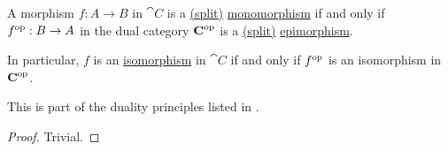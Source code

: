 \begin{proposition}\label{thm:morphism_invertibility_duality}
  A morphism \( f: A \to B \) in \( \cat{C} \) is a \hyperref[def:morphism_invertibility/left_invertible]{(split)} \hyperref[def:morphism_invertibility/left_cancellative]{monomorphism} if and only if \( f^{\operatorname{op}}: B \to A \) in the dual category \( \operatorname{\mathbf{C}}^{\operatorname{op}} \) is a \hyperref[def:morphism_invertibility/right_invertible]{(split)} \hyperref[def:morphism_invertibility/right_cancellative]{epimorphism}.

  In particular, \( f \) is an \hyperref[def:morphism_invertibility/isomorphism]{isomorphism} in \( \cat{C} \) if and only if \( f^{\operatorname{op}} \) is an isomorphism in \( \operatorname{\mathbf{C}}^{\operatorname{op}} \).

  This is part of the duality principles listed in .
\end{proposition}
\begin{proof}
  Trivial.
\end{proof}

